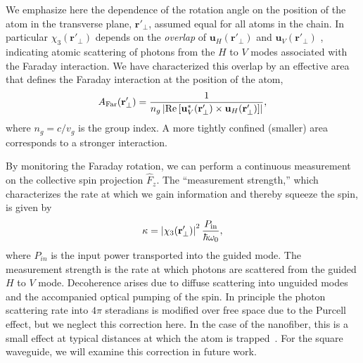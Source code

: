 \documentclass[preprint,aps,pra,onecolumn,superscriptaddress]{revtex4-1} %
\newcommand{\mbf}[1]{\mathbf{#1}}
\newcommand{\AF}{A_{\rm Far}} %
\begin{document}
We emphasize here the dependence of the rotation angle on the position of the atom in the transverse plane, $\mbf{r}'_\perp$, assumed equal for all atoms in the chain.  In particular $\chi_3(\mbf{r}'_\perp)$ depends on the {\em overlap} of $\mbf{u}_H (\mbf{r}'_\perp)$ and $\mbf{u}_V (\mbf{r}'_\perp)$ , indicating atomic scattering of photons from the $H$ to $V$ modes associated with the Faraday interaction.  We have characterized this overlap by an effective area that defines the Faraday interaction at the position of the atom,
\begin{equation}\label{eq:AFar}
\AF(\mbf{r}'_\perp) = \frac{1}{n_g \left\vert \text{Re} \left[ \mbf{u}^*_V (\mbf{r}'_\perp) \times \mbf{u}_H (\mbf{r}'_\perp) \right]\right\vert},
\end{equation}
where $n_g = c/v_g$ is the group index.  A more tightly confined (smaller) area corresponds to a stronger interaction.

By monitoring the Faraday rotation, we can perform a continuous measurement on the collective spin projection $\hat{F}_z$.  The ``measurement strength,'' which characterizes the rate at which we gain information and thereby squeeze the spin, is given by
\begin{equation}\label{eq:kappa}
\kappa = \left\vert \chi_3(\mbf{r}'_\perp) \right\vert^2 \frac{P_{\rm in}}{\hbar \omega_0},
\end{equation}
where $P_{in}$ is the input power transported into the guided mode.  The measurement strength is the rate at which photons are scattered from the guided $H$ to $V$ mode.  Decoherence arises due to diffuse scattering into unguided modes and the accompanied optical pumping of the spin.  In principle the photon scattering rate into $4\pi$ steradians is modified over free space due to the Purcell effect, but we neglect this correction here.  In the case of the nanofiber, this is a small effect at typical distances at which the atom is trapped~\cite{LeKien2005,Kien2008}.  For the square waveguide, we will examine this correction in future work.  
\end{document}

